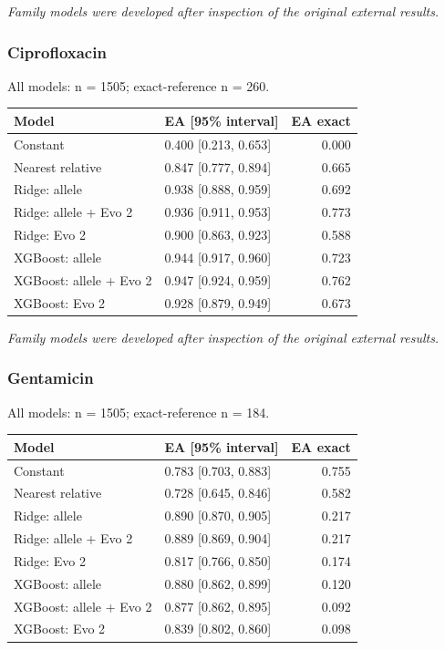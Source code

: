 \documentclass[
  10pt,
]{article}
\newcounter{none} %
\begin{document}
\emph{Family models were developed after inspection of the original
external results.}

\subsubsection{Ciprofloxacin}\label{ciprofloxacin-1}

All models: n = 1505; exact-reference n = 260.

{\def\LTcaptype{none} %
\begin{longtable}[]{@{}llr@{}}
\toprule\noalign{}
Model & EA {[}95\% interval{]} & EA exact \\
\midrule\noalign{}
\endhead
\bottomrule\noalign{}
\endlastfoot
Constant & 0.400 {[}0.213, 0.653{]} & 0.000 \\
Nearest relative & 0.847 {[}0.777, 0.894{]} & 0.665 \\
Ridge: allele & 0.938 {[}0.888, 0.959{]} & 0.692 \\
Ridge: allele + Evo 2 & 0.936 {[}0.911, 0.953{]} & 0.773 \\
Ridge: Evo 2 & 0.900 {[}0.863, 0.923{]} & 0.588 \\
XGBoost: allele & 0.944 {[}0.917, 0.960{]} & 0.723 \\
XGBoost: allele + Evo 2 & 0.947 {[}0.924, 0.959{]} & 0.762 \\
XGBoost: Evo 2 & 0.928 {[}0.879, 0.949{]} & 0.673 \\
\end{longtable}
}

\emph{Family models were developed after inspection of the original
external results.}

\subsubsection{Gentamicin}\label{gentamicin-1}

All models: n = 1505; exact-reference n = 184.

{\def\LTcaptype{none} %
\begin{longtable}[]{@{}llr@{}}
\toprule\noalign{}
Model & EA {[}95\% interval{]} & EA exact \\
\midrule\noalign{}
\endhead
\bottomrule\noalign{}
\endlastfoot
Constant & 0.783 {[}0.703, 0.883{]} & 0.755 \\
Nearest relative & 0.728 {[}0.645, 0.846{]} & 0.582 \\
Ridge: allele & 0.890 {[}0.870, 0.905{]} & 0.217 \\
Ridge: allele + Evo 2 & 0.889 {[}0.869, 0.904{]} & 0.217 \\
Ridge: Evo 2 & 0.817 {[}0.766, 0.850{]} & 0.174 \\
XGBoost: allele & 0.880 {[}0.862, 0.899{]} & 0.120 \\
XGBoost: allele + Evo 2 & 0.877 {[}0.862, 0.895{]} & 0.092 \\
XGBoost: Evo 2 & 0.839 {[}0.802, 0.860{]} & 0.098 \\
\end{longtable}
}
\end{document}
